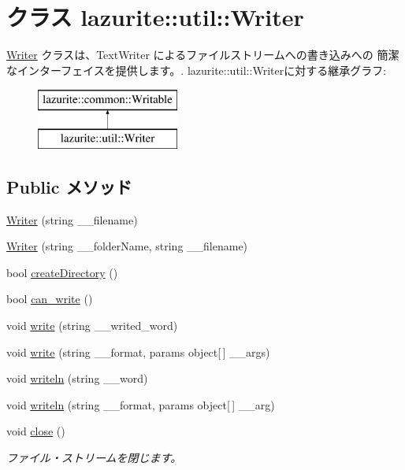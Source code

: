 \hypertarget{classlazurite_1_1util_1_1_writer}{
\section{クラス lazurite::util::Writer}
\label{classlazurite_1_1util_1_1_writer}
}


\hyperlink{classlazurite_1_1util_1_1_writer}{Writer} クラスは、TextWriter によるファイルストリームへの書き込みへの 簡潔なインターフェイスを提供します。.  
lazurite::util::Writerに対する継承グラフ:\begin{figure}[H]
\begin{center}
\leavevmode
\includegraphics[height=2cm]{classlazurite_1_1util_1_1_writer}
\end{center}
\end{figure}
\subsection*{Public メソッド}
\begin{DoxyCompactItemize}
\item 
\hyperlink{classlazurite_1_1util_1_1_writer_a0b9d88e8ee23a4012f73c06808f6d55d}{Writer} (string \_\-\_\-filename)
\item 
\hyperlink{classlazurite_1_1util_1_1_writer_a67cd02f6bbf65a91f2613fcd54217254}{Writer} (string \_\-\_\-folderName, string \_\-\_\-filename)
\item 
bool \hyperlink{classlazurite_1_1util_1_1_writer_a79c6ba39ea94a6a6be211e7172f944e5}{createDirectory} ()
\item 
bool \hyperlink{classlazurite_1_1util_1_1_writer_a2bf9621aaa39def983069d70c09e5c6a}{can\_\-write} ()
\item 
void \hyperlink{classlazurite_1_1util_1_1_writer_af7b90159ade4db522568ba46b3c0a00a}{write} (string \_\-\_\-writed\_\-word)
\item 
void \hyperlink{classlazurite_1_1util_1_1_writer_ae7beb36247424b99646f4b557fcafa59}{write} (string \_\-\_\-format, params object\mbox{[}$\,$\mbox{]} \_\-\_\-args)
\item 
void \hyperlink{classlazurite_1_1util_1_1_writer_a38610a24a9bda46a3ba1e01617a4edf5}{writeln} (string \_\-\_\-word)
\item 
void \hyperlink{classlazurite_1_1util_1_1_writer_a94ba55d8211171403215e84c2da2b162}{writeln} (string \_\-\_\-format, params object\mbox{[}$\,$\mbox{]} \_\-\_\-arg)
\item 
void \hyperlink{classlazurite_1_1util_1_1_writer_a68dcf9775d5b433d3036e9bffb138f00}{close} ()
\begin{DoxyCompactList}\small\item\em ファイル・ストリームを閉じます。 \item\end{DoxyCompactList}\end{DoxyCompactItemize}
